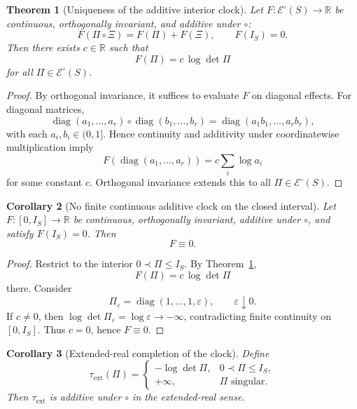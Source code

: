 \documentclass[11pt]{article}
\numberwithin{equation}{section}
\theoremstyle{thmcompact}
\newtheorem{theorem}{Theorem}[section]
\newtheorem{corollary}[theorem]{Corollary}
\theoremstyle{remark}
\begin{document}
\begin{theorem}[Uniqueness of the additive interior clock]\label{thm:clock-uniqueness}
Let $F:\mathcal E^\circ(S)\to\mathbb R$ be continuous, orthogonally invariant, and additive under $\circ$:
\[
F(\Pi\circ\Xi)=F(\Pi)+F(\Xi),
\qquad
F(I_S)=0.
\]
Then there exists $c\in\mathbb R$ such that
\begin{equation}\label{eq:clock-uniqueness}
F(\Pi)=c\,\log\det\Pi
\end{equation}
for all $\Pi\in\mathcal E^\circ(S)$.
\end{theorem}

\begin{proof}
By orthogonal invariance, it suffices to evaluate $F$ on diagonal effects. For diagonal matrices,
\[
\operatorname{diag}(a_1,\dots,a_r)\circ \operatorname{diag}(b_1,\dots,b_r)
=
\operatorname{diag}(a_1b_1,\dots,a_rb_r),
\]
with each $a_i,b_i\in(0,1]$. Hence continuity and additivity under coordinatewise multiplication imply
\[
F(\operatorname{diag}(a_1,\dots,a_r)) = c\sum_i \log a_i
\]
for some constant $c$. Orthogonal invariance extends this to all $\Pi\in\mathcal E^\circ(S)$.
\end{proof}

\begin{corollary}[No finite continuous additive clock on the closed interval]\label{cor:no-global-finite-clock}
Let $F:[0,I_S]\to\mathbb R$ be continuous, orthogonally invariant, additive under $\circ$, and satisfy $F(I_S)=0$. Then
\[
F\equiv 0.
\]
\end{corollary}

\begin{proof}
Restrict to the interior $0\prec \Pi\le I_S$. By Theorem~\ref{thm:clock-uniqueness},
\[
F(\Pi)=c\,\log\det\Pi
\]
there. Consider
\[
\Pi_\varepsilon=\operatorname{diag}(1,\dots,1,\varepsilon),
\qquad \varepsilon\downarrow 0.
\]
If $c\neq 0$, then $\log\det\Pi_\varepsilon=\log\varepsilon\to -\infty$, contradicting finite continuity on $[0,I_S]$. Thus $c=0$, hence $F\equiv 0$.
\end{proof}

\begin{corollary}[Extended-real completion of the clock]\label{cor:extended-clock}
Define
\[
\tau_{\mathrm{ext}}(\Pi)
=
\begin{cases}
-\log\det\Pi, & 0\prec \Pi\le I_S,\\
+\infty, & \Pi \text{ singular.}
\end{cases}
\]
Then $\tau_{\mathrm{ext}}$ is additive under $\circ$ in the extended-real sense.
\end{corollary}
\end{document}
